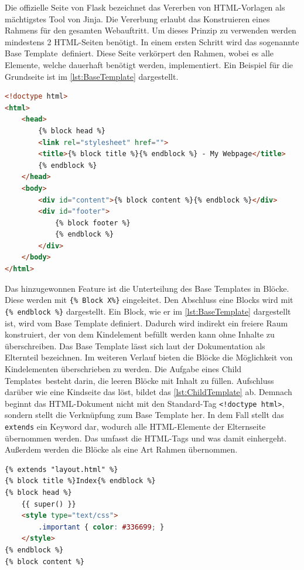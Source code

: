 \documentclass[a4paper,titlepage,halfparskip,12pt]{scrreprt}
\begin{document}
\begin{onehalfspacing}
Die offizielle Seite von Flask bezeichnet das Vererben von HTML-Vorlagen als mächtigstes Tool von Jinja. Die Vererbung erlaubt das Konstruieren eines Rahmens für den gesamten Webauftritt. Um dieses Prinzip zu verwenden werden mindestens 2 HTML-Seiten benötigt. In einem ersten Schritt wird das sogenannte \glqq Base Template\grqq\ definiert. Diese Seite verkörpert den Rahmen, wobei es alle Elemente, welche dauerhaft benötigt werden, implementiert. Ein Beispiel für die Grundseite ist im \autoref{lst:BaseTemplate} dargestellt.
\begin{lstlisting}[language=HTML,caption=Beispiel einer Grundseite für das Vererbungsprinzip,label={lst:BaseTemplate}]
<!doctype html>
<html>
	<head>
		{% block head %}
		<link rel="stylesheet" href="">
		<title>{% block title %}{% endblock %} - My Webpage</title>
		{% endblock %}
	</head>
	<body>
		<div id="content">{% block content %}{% endblock %}</div>
		<div id="footer">
			{% block footer %}
			{% endblock %}
		</div>
	</body>
</html>
\end{lstlisting}
Das hinzugewonnen Feature ist die Unterteilung des Base Templates in Blöcke. Diese werden mit \texttt{\{\% Block X\%\}} eingeleitet. Den Abschluss eine Blocks wird mit \texttt{\{\% endblock \%\}} dargestellt. Ein Block, wie er im \autoref{lst:BaseTemplate} dargestellt ist, wird vom Base Template definiert. Dadurch wird indirekt ein freiere Raum konstruiert, der von dem Kindelement befüllt werden kann ohne Inhalte zu überschreiben. Das Base Template lässt sich laut der Dokumentation als Elternteil bezeichnen. Im weiteren Verlauf bieten die Blöcke die Möglichkeit von Kindelementen überschrieben zu werden. Die Aufgabe eines \glqq Child Templates\grqq\ besteht darin, die leeren Blöcke mit Inhalt zu füllen. Aufschluss darüber wie eine Kindseite das löst, bildet das \autoref{lst:ChildTemplate} ab. Demnach beginnt das HTML-Dokument nicht mit den Standard-Tag \texttt{<!doctype html>}, sondern stellt die Verknüpfung zum Base Template her. In dem Fall stellt das \texttt{extends} ein Keyword dar, wodurch alle HTML-Elemente der Elternseite übernommen werden. Das umfasst die HTML-Tags und was damit einhergeht. Außerdem werden die Blöcke als eine Art Rahmen übernommen.
\begin{lstlisting}[language=HTML,caption=Beispiel für Kindseite beim Vererbungsprinzip von Jinja,label={lst:ChildTemplate}]
{% extends "layout.html" %}
{% block title %}Index{% endblock %}
{% block head %}
	{{ super() }}
	<style type="text/css">
		.important { color: #336699; }
	</style>
{% endblock %}
{% block content %}

\end{lstlisting}
\end{onehalfspacing}
\end{document}
